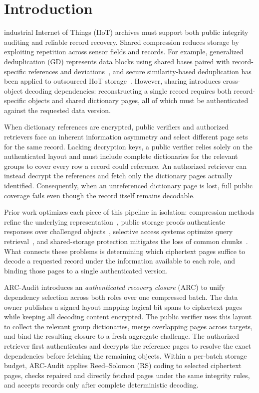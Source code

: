 \documentclass[10pt,journal]{IEEEtran}
\begin{document}
\section{Introduction}\label{sec:introduction}
 industrial Internet of Things (IIoT) archives must support both public integrity auditing and reliable record recovery. Shared compression reduces storage by exploiting repetition across sensor fields and records. For example, generalized deduplication (GD) represents data blocks using shared bases paired with record-specific references and deviations~\cite{Talasila2019}, and secure similarity-based deduplication has been applied to outsourced IIoT storage~\cite{Gao2024}. However, sharing introduces cross-object decoding dependencies: reconstructing a single record requires both record-specific objects and shared dictionary pages, all of which must be authenticated against the requested data version.

When dictionary references are encrypted, public verifiers and authorized retrievers face an inherent information asymmetry and select different page sets for the same record. Lacking decryption keys, a public verifier relies solely on the authenticated layout and must include complete dictionaries for the relevant groups to cover every row a record could reference. An authorized retriever can instead decrypt the references and fetch only the dictionary pages actually identified. Consequently, when an unreferenced dictionary page is lost, full public coverage fails even though the record itself remains decodable.

Prior work optimizes each piece of this pipeline in isolation: compression methods refine the underlying representation~\cite{Hurst2024GreedyGD}, public storage proofs authenticate responses over challenged objects~\cite{ShachamWaters2013}, selective access systems optimize query retrieval~\cite{Taurone2024TREAT}, and shared-storage protection mitigates the loss of common chunks~\cite{Bhagwat2006Reliability}. What connects these problems is determining which ciphertext pages suffice to decode a requested record under the information available to each role, and binding those pages to a single authenticated version.

ARC-Audit introduces an \emph{authenticated recovery closure} (ARC) to unify dependency selection across both roles over one compressed batch. The data owner publishes a signed layout mapping logical bit spans to ciphertext pages while keeping all decoding content encrypted. The public verifier uses this layout to collect the relevant group dictionaries, merge overlapping pages across targets, and bind the resulting closure to a fresh aggregate challenge. The authorized retriever first authenticates and decrypts the reference pages to resolve the exact dependencies before fetching the remaining objects. Within a per-batch storage budget, ARC-Audit applies Reed--Solomon (RS) coding to selected ciphertext pages, checks repaired and directly fetched pages under the same integrity rules, and accepts records only after complete deterministic decoding.
\end{document}
